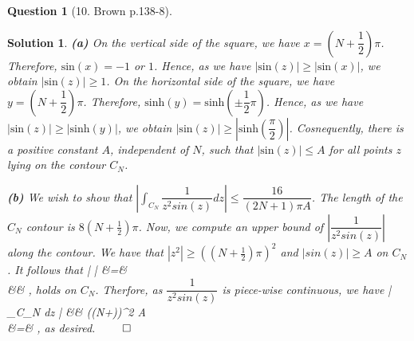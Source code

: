 \documentclass{article} %
\def\eQb#1\eQe{\begin{eqnarray*}#1\end{eqnarray*}}
\theoremstyle{quest}
\newtheorem*{question}{Question}
\newtheorem*{solution}{Solution}
\begin{document}
\begin{question}[10. Brown p.138-8]
\end{question}
\begin{solution}
\textbf{(a)} 
On the vertical side of the square, we have $ x = (N + \dfrac{1}{2})\pi$. Therefore, 
$\mathrm{sin}(x) = -1$ or $1$. Hence, as we have $|\mathrm{sin}(z)| \geq |\mathrm{sin}(x)|$,
we obtain $|\mathrm{sin}(z)| \geq 1$. On the horizontal side of the square, we have
$y = (N + \dfrac{1}{2})\pi$. Therefore, $\mathrm{sinh}(y) = \mathrm{sinh}(\pm \dfrac{1}{2}\pi)$.
Hence, as we have $|\mathrm{sin}(z)| \geq |\mathrm{sinh}(y)|$, we obtain 
$|\mathrm{sin}(z)| \geq |\mathrm{sinh}(\dfrac{\pi}{2})|$. Cosnequently, there is a positive constant $A$,
independent of $N$, such that $|\mathrm{sin}(z)| \leq A$ for all points $z$ lying on the contour
$C_N$.

\bigskip
 
\textbf{(b)} We wish to show that 
$\left| \int_{C_N} \dfrac{1}{z^2 sin(z)} dz \right| 
\leq \dfrac{16}{(2N+1)\pi A}$.
 The length of the $C_N$ contour is $8(N+\frac{1}{2})\pi$. Now,
we compute an upper bound of $\left| \dfrac{1}{z^2 sin(z)} \right|$ along the contour.
We have that $|z^2| \geq ((N+\frac{1}{2})\pi)^2$ and $|sin(z)| \geq A$ on $C_N$. 
It follows that
\eQb
\left|  \right| &=&  \\
&\leq& ,
\eQe
holds on $C_N$. Therfore, as $\dfrac{1}{z^2 sin(z)}$ is piece-wise continuous, we have
\eQb
\left| \int_{C_N}  dz \right| &\leq& 
{((N+)\pi)^2 A} \\ 
&=& ,
\eQe
as desired. $\qed$

\end{solution}
\end{document}
